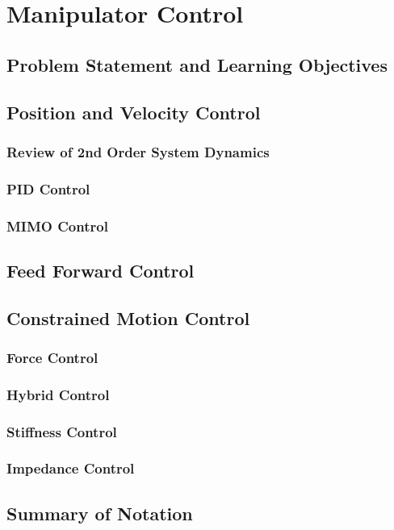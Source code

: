 %

\chapter{Manipulator Control}

\section{Problem Statement and Learning Objectives}



\section{Position and Velocity Control}

\subsection{Review of 2nd Order System Dynamics}
\subsection{PID Control}
\subsection{MIMO Control}

\section{Feed Forward Control}

\section{Constrained Motion Control}
\subsection{Force Control}

\subsection{Hybrid Control}

\subsection{Stiffness Control}

\subsection{Impedance Control}


\section{Summary of Notation}


